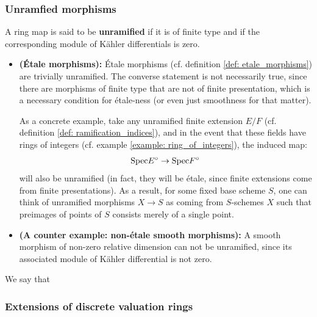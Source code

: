         \subsubsection{Unramfied morphisms}
            \begin{definition} \label{def: unramified_morphisms}
                A ring map is said to be \textbf{unramified} if it is of finite type and if the corresponding module of K\"ahler differentials is zero. 
            \end{definition}
            \begin{example}
                \noindent
                \begin{itemize}
                    \item \textbf{(\'Etale morphisms):} \'Etale morphisms (cf. definition \ref{def: etale_morphisms}) are trivially unramified. The converse statement is not necessarily true, since there are morphisms of finite type that are not of finite presentation, which is a necessary condition for \'etale-ness (or even just smoothness for that matter).
                    
                    As a concrete example, take any unramified finite extension $E/F$ (cf. definition \ref{def: ramification_indices}), and in the event that these fields have rings of integers (cf. example \ref{example: ring_of_integers}), the induced map:
                        $$\mathrm{Spec} E^{\circ} \to \mathrm{Spec} F^{\circ}$$
                    will also be unramified (in fact, they will be \'etale, since finite extensions come from finite presentations). As a result, for some fixed base scheme $S$, one can think of unramified morphisms $X \to S$ as coming from $S$-schemes $X$ such that preimages of points of $S$ consists merely of a single point. 
                    \item \textbf{(A counter example: non-\'etale smooth morphisms):} A smooth morphism of non-zero relative dimension can not be unramified, since its associated module of K\"ahler differential is not zero. 
                \end{itemize}
            \end{example}
            
            \begin{proposition} \label{prop: locality_of_ramification}
                We say that 
            \end{proposition}
            
        \subsubsection{Extensions of discrete valuation rings}
            
